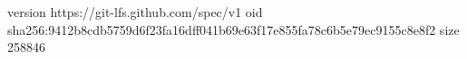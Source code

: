 version https://git-lfs.github.com/spec/v1
oid sha256:9412b8cdb5759d6f23fa16dff041b69e63f17e855fa78c6b5e79ec9155c8e8f2
size 258846
